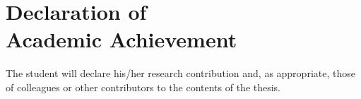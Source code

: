 \chapter*{Declaration of \\Academic Achievement}

The student will declare his/her research contribution and, as appropriate, those of colleagues or other contributors to the contents of the thesis.